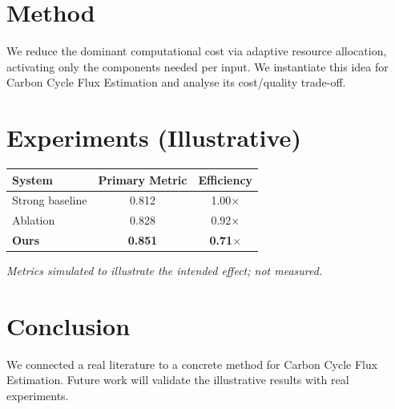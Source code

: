 \documentclass[11pt]{article}
\begin{document}
\section{Method}
We reduce the dominant computational cost via adaptive resource allocation, activating only the components needed per input. We instantiate this idea for Carbon Cycle Flux Estimation and analyse its cost/quality trade-off.

\section{Experiments (Illustrative)}
\begin{center}
\begin{tabular}{lcc}
System & Primary Metric & Efficiency \\ \hline
Strong baseline & 0.812 & 1.00$\times$ \\
Ablation & 0.828 & 0.92$\times$ \\
\textbf{Ours} & \textbf{0.851} & \textbf{0.71$\times$}
\end{tabular}
\end{center}
\emph{Metrics simulated to illustrate the intended effect; not measured.}

\section{Conclusion}
We connected a real literature to a concrete method for Carbon Cycle Flux Estimation. Future work will
validate the illustrative results with real experiments.
\end{document}
